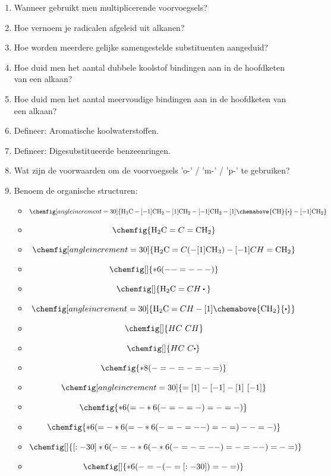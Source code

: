 \documentclass[a4paper,12pt]{article}
\begin{document}
\begin{enumerate}
        \item Wanneer gebruikt men multiplicerende voorvoegsels?
        \item Hoe vernoem je radicalen afgeleid uit alkanen?
        \item Hoe worden meerdere gelijke samengestelde substituenten aangeduid? 
        \item Hoe duid men het aantal dubbele koolstof bindingen aan in de hoofdketen van een alkaan?
        \item Hoe duid men het aantal meervoudige bindingen aan in de hoofdketen van een alkaan? 
        \item Defineer: Aromatische koolwaterstoffen. 
        \item Defineer: Digesubstitueerde benzeenringen. 
        \item Wat zijn de voorwaarden om de voorvoegsels 'o-' / 'm-' / 'p-' te gebruiken?
        \item Benoem de organische structuren:
            \begin{itemize}
                \item $$\chemfig[angle increment=30]{\ce{H3C}-[-1]\ce{CH2}-[1]\ce{CH2}-[-1]\ce{CH2}-[1]\chemabove{\ce{CH}}{\bigcdot}-[-1]\ce{CH2}}$$
                \item $$\chemfig{\ce{H2C}=C=\ce{CH2}}$$
                \item $$\chemfig[angle increment=30]{\ce{H2C}=C(-[1]\ce{CH3})-[-1]CH=\ce{CH2}}$$
                \item $$\chemfig[]{*6(--=---)}$$
                \item $$\chemfig[]{\ce{H2C}=CH\bigcdot{}}$$
                \item $$\chemfig[angle increment=30]{\ce{H2C}=CH-[1]\chemabove{\ce{CH2}}{\bigcdot}}$$
                \item $$\chemfig[]{HC~CH}$$
                \item $$\chemfig[]{HC~C\bigcdot}$$
                \item $$\chemfig{*8(-=-=-=-=)}$$
                \item $$\chemfig[angle increment=30]{=[1]-[-1]-[1]~[-1]}$$
                \item $$\chemfig{*6(=-*6(-=-=-)=-=-)}$$
                \item $$\chemfig{*6(=-*6(=-*6(-=-=--)=-=)--=-)}$$
                \item $$\chemfig[]{[:-30]*6(-=-*6(-*6(-=-=--)=-=--)=-=)}$$
                \item $$\chemfig[]{*6(-=-(-=[:-30])=-=)}$$

\end{itemize}
\end{enumerate}
\end{document}
